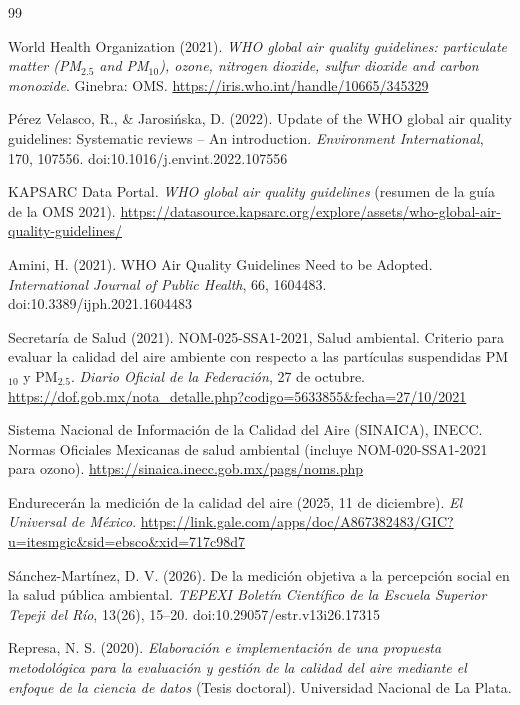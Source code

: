 \documentclass[11pt,letterpaper]{article}
\begin{document}
\begin{thebibliography}{99}
\small
\setlength{\itemsep}{1pt}

 World Health Organization (2021). \textit{WHO global air quality guidelines: particulate matter (PM$_{2.5}$ and PM$_{10}$), ozone, nitrogen dioxide, sulfur dioxide and carbon monoxide}. Ginebra: OMS. \url{https://iris.who.int/handle/10665/345329}

 P\'erez Velasco, R., \& Jarosi\'nska, D. (2022). Update of the WHO global air quality guidelines: Systematic reviews -- An introduction. \textit{Environment International}, 170, 107556. doi:10.1016/j.envint.2022.107556

 KAPSARC Data Portal. \textit{WHO global air quality guidelines} (resumen de la gu\'ia de la OMS 2021). \url{https://datasource.kapsarc.org/explore/assets/who-global-air-quality-guidelines/}

 Amini, H. (2021). WHO Air Quality Guidelines Need to be Adopted. \textit{International Journal of Public Health}, 66, 1604483. doi:10.3389/ijph.2021.1604483

 Secretar\'ia de Salud (2021). NOM-025-SSA1-2021, Salud ambiental. Criterio para evaluar la calidad del aire ambiente con respecto a las part\'iculas suspendidas PM$_{10}$ y PM$_{2.5}$. \textit{Diario Oficial de la Federaci\'on}, 27 de octubre. \url{https://dof.gob.mx/nota_detalle.php?codigo=5633855&fecha=27/10/2021}

 Sistema Nacional de Informaci\'on de la Calidad del Aire (SINAICA), INECC. Normas Oficiales Mexicanas de salud ambiental (incluye NOM-020-SSA1-2021 para ozono). \url{https://sinaica.inecc.gob.mx/pags/noms.php}

 Endurecer\'an la medici\'on de la calidad del aire (2025, 11 de diciembre). \textit{El Universal de M\'exico}. \url{https://link.gale.com/apps/doc/A867382483/GIC?u=itesmgic&sid=ebsco&xid=717c98d7}

 S\'anchez-Mart\'inez, D. V. (2026). De la medici\'on objetiva a la percepci\'on social en la salud p\'ublica ambiental. \textit{TEPEXI Bolet\'in Cient\'ifico de la Escuela Superior Tepeji del R\'io}, 13(26), 15--20. doi:10.29057/estr.v13i26.17315

 Represa, N. S. (2020). \textit{Elaboraci\'on e implementaci\'on de una propuesta metodol\'ogica para la evaluaci\'on y gesti\'on de la calidad del aire mediante el enfoque de la ciencia de datos} (Tesis doctoral). Universidad Nacional de La Plata.


\end{thebibliography}
\end{document}
